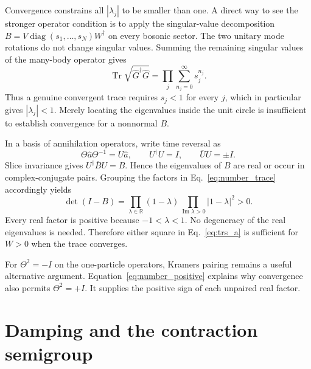 \documentclass[11pt,a4paper]{article}
\newcommand{\Tr}{\operatorname{Tr}}
\newcommand{\diag}{\operatorname{diag}}
\numberwithin{equation}{section}
\begin{document}
Convergence constrains all $|\lambda_j|$ to be smaller than one. A direct
way to see the stronger operator condition is to apply the singular-value
decomposition $B=V\diag(s_1,\ldots,s_N)W^\dagger$ on every bosonic sector.
The two unitary mode rotations do not change singular values. Summing the
remaining singular values of the many-body operator gives
\begin{equation}
 \Tr\sqrt{\hat G^\dagger\hat G}
 =\prod_j\sum_{n_j=0}^{\infty}s_j^{n_j}.
 \label{eq:number_singular}
\end{equation}
Thus a genuine convergent trace requires $s_j<1$ for every $j$, which in
particular gives $|\lambda_j|<1$. Merely locating the eigenvalues inside the
unit circle is insufficient to establish convergence for a nonnormal $B$.

In a basis of annihilation operators, write time reversal as
\begin{equation}
 \Theta\hat a\Theta^{-1}=U\hat a,
 \qquad U^\dagger U=I,\qquad \overline U U=\pm I.
 \label{eq:trs_a}
\end{equation}
Slice invariance gives $U^\dagger\overline B U=B$. Hence the eigenvalues of
$B$ are real or occur in complex-conjugate pairs. Grouping the factors in
Eq.~\eqref{eq:number_trace} accordingly yields
\begin{equation}
 \det(I-B)=
 \prod_{\lambda\in\mathbb R}(1-\lambda)
 \prod_{\operatorname{Im}\lambda>0}|1-\lambda|^2>0.
 \label{eq:number_positive}
\end{equation}
Every real factor is positive because $-1<\lambda<1$. No degeneracy of the
real eigenvalues is needed. Therefore either square in
Eq.~\eqref{eq:trs_a} is sufficient for $W>0$ when the trace converges.

For $\Theta^2=-I$ on the one-particle operators, Kramers pairing remains a
useful alternative argument. Equation~\eqref{eq:number_positive} explains
why convergence also permits $\Theta^2=+I$. It supplies the positive sign of
each unpaired real factor.

\section{Damping and the contraction semigroup}
\label{sec:contraction}
\end{document}
